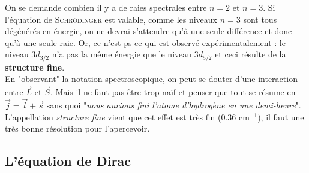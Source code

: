 On se demande combien il y a de raies spectrales entre $n=2$ et $n=3$. Si l'équation de \textsc{Schrödinger} 
est valable, comme les niveaux $n=3$ sont tous dégénérés en énergie, on ne devrai s'attendre qu'à une seule
différence et donc qu'à une seule raie. Or, ce n'est ps ce qui est observé expérimentalement : le niveau
$3d_{3/2}$ n'a pas la même énergie que le niveau $3d_{5/2}$ et ceci résulte de la \textbf{structure fine}. \\

En "observant" la notation spectroscopique, on peut se douter d'une interaction entre $\vec{L}$ et $\vec S$. 
Mais il ne faut pas être trop naïf et penser que tout se résume en $\vec{j}=\vec l +\vec s$ sans quoi 
"\textit{nous aurions fini l'atome d'hydrogène en une demi-heure}". L'appellation \textit{structure fine} 
vient que cet effet est très fin (0.36 cm$^{-1}$), il faut une très bonne résolution pour l’apercevoir.

\subsection{L'équation de Dirac}
































